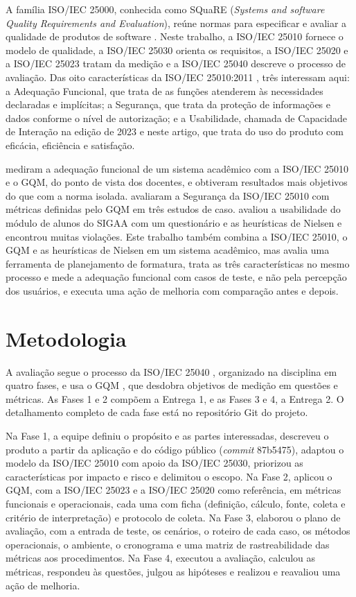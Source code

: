 \documentclass[12pt]{article}
\begin{document}
A família ISO/IEC 25000, conhecida como SQuaRE (\textit{Systems and software
Quality Requirements and Evaluation}), reúne normas para especificar e avaliar a
qualidade de produtos de software \cite{iso25000}. Neste trabalho, a ISO/IEC 25010
fornece o modelo de qualidade, a ISO/IEC 25030 orienta os requisitos, a ISO/IEC 25020
e a ISO/IEC 25023 tratam da medição \cite{iso25030,iso25020,iso25023} e a ISO/IEC
25040 descreve o processo de avaliação. Das oito características da ISO/IEC
25010:2011 \cite{iso25010}, três interessam aqui: a Adequação Funcional, que trata de
as funções atenderem às necessidades declaradas e implícitas; a Segurança, que trata
da proteção de informações e dados conforme o nível de autorização; e a Usabilidade,
chamada de Capacidade de Interação na edição de 2023 \cite{iso25010v2023} e neste
artigo, que trata do uso do produto com eficácia, eficiência e satisfação.

\cite{puspaningrum2017functional} mediram a adequação funcional de um sistema
acadêmico com a ISO/IEC 25010 e o GQM, do ponto de vista dos docentes, e obtiveram
resultados mais objetivos do que com a norma isolada.
\cite{calabrese2018assistant} avaliaram a Segurança da ISO/IEC 25010 com métricas
definidas pelo GQM em três estudos de caso. \cite{carvalho2016sigaa} avaliou a
usabilidade do módulo de alunos do SIGAA com um questionário e as heurísticas de
Nielsen e encontrou muitas violações. Este trabalho também combina a ISO/IEC 25010,
o GQM e as heurísticas de Nielsen em um sistema acadêmico, mas avalia uma ferramenta
de planejamento de formatura, trata as três características no mesmo processo e mede
a adequação funcional com casos de teste, e não pela percepção dos usuários, e
executa uma ação de melhoria com comparação antes e depois.

\section{Metodologia}\label{sec:metodologia}

A avaliação segue o processo da ISO/IEC 25040 \cite{iso25040}, organizado na
disciplina em quatro fases, e usa o GQM \cite{basili1994gqm}, que desdobra objetivos
de medição em questões e métricas. As Fases 1 e 2 compõem a Entrega 1,
e as Fases 3 e 4, a Entrega 2. O detalhamento completo de cada fase está no
repositório Git do projeto.

Na Fase 1, a equipe definiu o propósito e as partes interessadas, descreveu o produto
a partir da aplicação e do código público (\textit{commit} 87b5475), adaptou o modelo
da ISO/IEC 25010 com apoio da ISO/IEC 25030, priorizou as características por impacto
e risco e delimitou o escopo. Na Fase 2, aplicou o GQM, com a ISO/IEC 25023 e a
ISO/IEC 25020 como referência, em métricas funcionais e operacionais, cada uma com
ficha (definição, cálculo, fonte, coleta e critério de interpretação) e protocolo de
coleta. Na Fase 3, elaborou o plano de avaliação, com a entrada de teste, os cenários,
o roteiro de cada caso, os métodos operacionais, o ambiente, o cronograma e uma
matriz de rastreabilidade das métricas aos procedimentos. Na Fase 4, executou a
avaliação, calculou as métricas, respondeu às questões, julgou as hipóteses e realizou
e reavaliou uma ação de melhoria.
\end{document}
